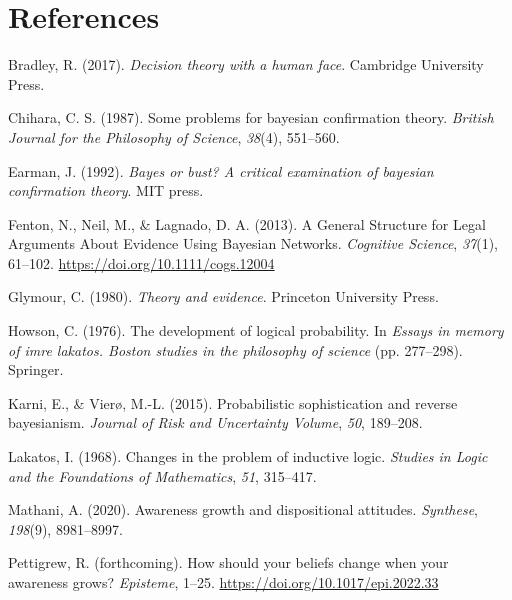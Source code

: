 \documentclass[
  11pt,
  dvipsnames,enabledeprecatedfontcommands, todos]{scrartcl}
\newlength{\cslhangindent}
\newlength{\cslentryspacingunit} %
\newenvironment{CSLReferences}[2] %
 {%
  \setlength{\parindent}{0pt}
  \ifodd #1
  \let\oldpar\par
  \def\par{\hangindent=\cslhangindent\oldpar}
  \fi
  \setlength{\parskip}{#2\cslentryspacingunit}
 }%
 {}
\begin{document}
\singlespace

\hypertarget{references}{%
\section*{References}\label{references}}

\hypertarget{refs}{}
\begin{CSLReferences}{1}{0}
\leavevmode{}%
Bradley, R. (2017). \emph{Decision theory with a human face}. Cambridge
University Press.

\leavevmode{}%
Chihara, C. S. (1987). Some problems for bayesian confirmation theory.
\emph{British Journal for the Philosophy of Science}, \emph{38}(4),
551--560.

\leavevmode{}%
Earman, J. (1992). \emph{Bayes or bust? A critical examination of
bayesian confirmation theory}. MIT press.

\leavevmode{}%
Fenton, N., Neil, M., \& Lagnado, D. A. (2013). A {General Structure}
for {Legal Arguments About Evidence Using Bayesian Networks}.
\emph{Cognitive Science}, \emph{37}(1), 61--102.
\url{https://doi.org/10.1111/cogs.12004}

\leavevmode{}%
Glymour, C. (1980). \emph{Theory and evidence}. Princeton University
Press.

\leavevmode{}%
Howson, C. (1976). The development of logical probability. In
\emph{Essays in memory of imre lakatos. Boston studies in the philosophy
of science} (pp. 277--298). Springer.

\leavevmode{}%
Karni, E., \& Vierø, M.-L. (2015). Probabilistic sophistication and
reverse bayesianism. \emph{Journal of Risk and Uncertainty Volume},
\emph{50}, 189--208.

\leavevmode{}%
Lakatos, I. (1968). Changes in the problem of inductive logic.
\emph{Studies in Logic and the Foundations of Mathematics}, \emph{51},
315--417.

\leavevmode{}%
Mathani, A. (2020). Awareness growth and dispositional attitudes.
\emph{Synthese}, \emph{198}(9), 8981--8997.

\leavevmode{}%
Pettigrew, R. (forthcoming). How should your beliefs change when your
awareness grows? \emph{Episteme}, 1--25.
\url{https://doi.org/10.1017/epi.2022.33}


\end{CSLReferences}
\end{document}
